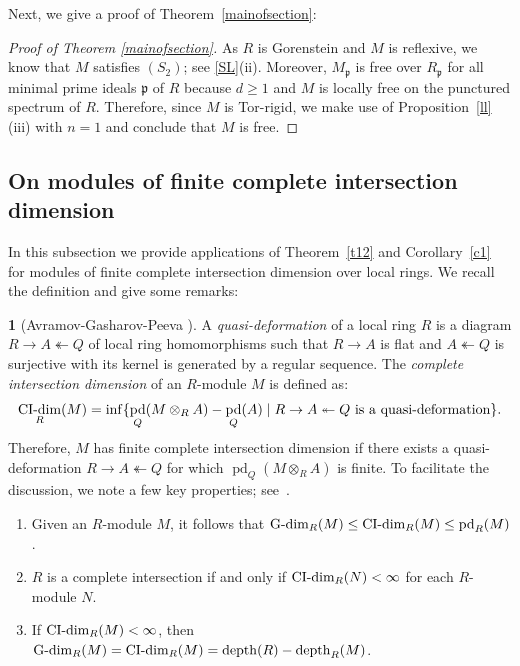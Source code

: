 \documentclass[11pt]{amsart}
\theoremstyle{definition}
\theoremstyle{definition}
\newtheorem{chunk}[thm]{\hspace*{-1.065ex}\bf}
\numberwithin{equation}{section}
\newcommand{\fp}{\mathfrak{p}}
\DeclareMathOperator{\CI}{\textnormal{CI-dim}}
\DeclareMathOperator{\Gdim}{\textnormal{G-dim}}
\DeclareMathOperator{\depth}{depth}
\DeclareMathOperator{\pd}{pd}
\begin{document}
Next, we give a proof of Theorem~\ref{mainofsection}:

\begin{proof} [Proof of Theorem \ref{mainofsection}] As $R$ is Gorenstein and $M$ is reflexive, we know that $M$ satisfies $(S_2)$; see \ref{SL}(ii). Moreover, $M_{\fp}$ is free over $R_{\fp}$ for all minimal prime ideals $\fp$ of $R$ because $d \geq 1$ and $M$ is locally free on the punctured spectrum of $R$. Therefore, since $M$ is Tor-rigid, we make use of Proposition~\ref{ll}(iii) with $n=1$ and conclude that $M$ is free. 
\end{proof}


\subsection*{On modules of finite complete intersection dimension} In this subsection we provide applications of Theorem~\ref{t12} and Corollary~\ref{c1} for modules of finite complete intersection dimension over local rings. We recall the definition and give some remarks:

\begin{chunk} [{Avramov-Gasharov-Peeva \cite{AGP}}] \label{CI} A \emph{quasi-deformation} of a local ring $R$ is a diagram $R\rightarrow A\twoheadleftarrow Q$ of local ring homomorphisms such that $R\rightarrow A$ is flat and $A\twoheadleftarrow Q$ is surjective with its kernel is generated by a regular sequence. The \emph{complete intersection dimension} of an $R$-module $M$ is defined as: $$\CI_R(M)=\inf\{\pd_Q(M\otimes_RA)-\pd_Q(A)\mid R\rightarrow A\twoheadleftarrow Q \text{ is a quasi-deformation}\}.$$
Therefore, $M$ has finite complete intersection dimension if there exists a quasi-deformation $R \rightarrow A \twoheadleftarrow Q$ for which $\pd_Q(M\otimes_RA)$ is finite. 
To facilitate the discussion, we note a few key properties; see~\cite[1.3 and 1.4]{AGP}.
\begin{enumerate}[\rm(i)] 
\item Given an $R$-module $M$, it follows that $\Gdim_R(M) \leq \CI_R(M) \leq \pd_R(M)$. 
\item $R$ is a complete intersection if and only if $\CI_R(N)<\infty$ for each $R$-module $N$.
\item If $\CI_R(M)<\infty$, then $\Gdim_R(M)=\CI_R(M)=\depth(R)-\depth_{R}(M)$.
\end{enumerate}
\end{chunk}	
\end{document}
